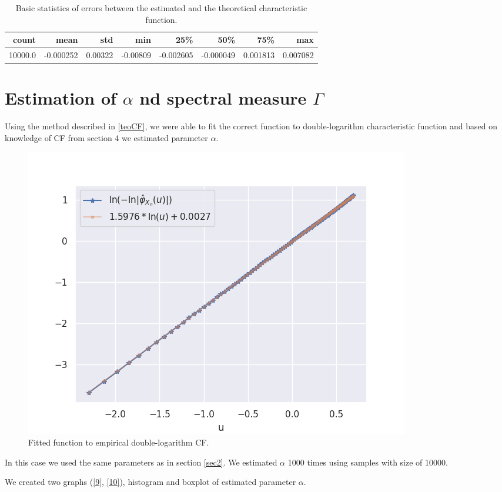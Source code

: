 \documentclass{article}
\begin{document}
	\begin{table}[H]
		\centering
		\begin{tabular}{rrrrrrrr}
			\hline
			count &      mean &      std &      min &       25\% &       50\% &       75\% &       max \\
			\hline
			10000.0 & -0.000252 &  0.00322 & -0.00809 & -0.002605 & -0.000049 &  0.001813 &  0.007082 \\
			\hline
		\end{tabular}
		\caption{Basic statistics of errors between the estimated and the theoretical characteristic function.}\label{tab1}
	\end{table}
	
	
	\section{Estimation of \texorpdfstring{$\alpha$ } and spectral measure \texorpdfstring{$\Gamma$}.}
	
	Using the method described in \ref{teoCF}, we were able to fit the correct function to double-logarithm characteristic function and based on knowledge of CF from section 4 we estimated parameter $\alpha$.
	
	\begin{figure}[H]
		\centering
		\includegraphics[width=0.8\linewidth]{images/compare_cf}
		\caption{Fitted function to empirical double-logarithm CF.}\label{11}
	\end{figure}
	In this case we used the same parameters as in section \ref{sec2}. We estimated $\alpha$ 1000 times using samples with size of 10000.
	
	We created two graphs (\ref{9}, \ref{10}), histogram and boxplot of estimated parameter $\alpha$.
	
\end{document}
